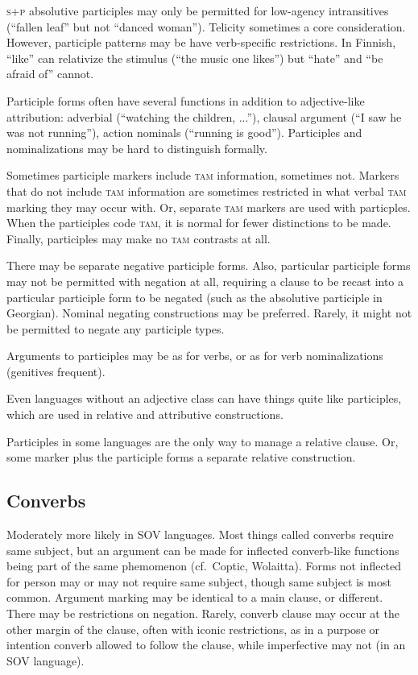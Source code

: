 \documentclass[11pt]{article}
\newcommand{\I}[1]{\textsc{#1}}   %
\begin{document}
\I{s+p} absolutive participles may only be permitted for low-agency
intransitives (``fallen leaf'' but not ``danced woman'').  Telicity
sometimes a core consideration.  However, participle patterns may be
have verb-specific restrictions.  In Finnish, ``like'' can relativize
the stimulus (``the music one likes'') but ``hate'' and ``be afraid
of'' cannot.

Participle forms often have several functions in addition to
adjective-like attribution: adverbial (``watching the children,
...''), clausal argument (``I saw he was not running''), action
nominals (``running is good'').  Participles and nominalizations may
be hard to distinguish formally.

Sometimes participle markers include \I{tam} information, sometimes
not.  Markers that do not include \I{tam} information are sometimes
restricted in what verbal \I{tam} marking they may occur with.  Or,
separate \I{tam} markers are used with particples.  When the
participles code \I{tam}, it is normal for fewer distinctions to be
made.  Finally, participles may make no \I{tam} contrasts at all.

There may be separate negative participle forms.  Also, particular
participle forms may not be permitted with negation at all, requiring
a clause to be recast into a particular participle form to be negated
(such as the absolutive participle in Georgian).  Nominal negating
constructions may be preferred.  Rarely, it might not be permitted to
negate any participle types.

Arguments to participles may be as for verbs, or as for verb
nominalizations (genitives frequent).

Even languages without an adjective class can have things quite like
participles, which are used in relative and attributive constructions. 

Participles in some languages are the only way to manage a relative
clause.  Or, some marker plus the participle forms a separate relative
construction. 


\subsection{Converbs}
Moderately more likely in SOV languages. Most things called converbs
require same subject, but an argument can be made for inflected
converb-like functions being part of the same phemomenon (cf.\ Coptic,
Wolaitta).  Forms not inflected for person may or may not require same
subject, though same subject is most common.  Argument marking may be
identical to a main clause, or different.  There may be restrictions
on negation.  Rarely, converb clause may occur at the other margin of
the clause, often with iconic restrictions, as in a purpose or
intention converb allowed to follow the clause, while imperfective may
not (in an SOV language).
\end{document}
